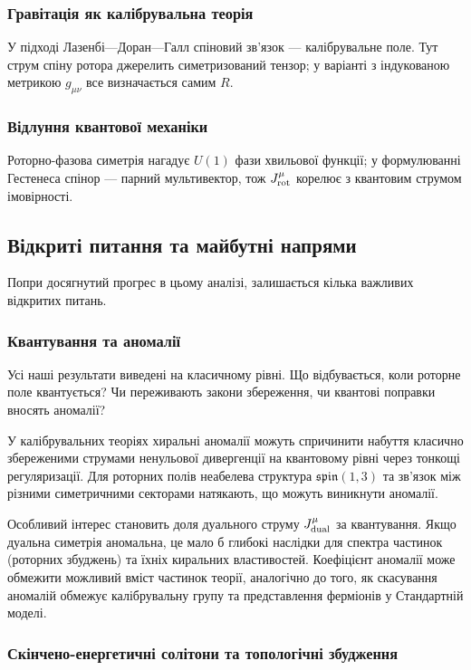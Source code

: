 \documentclass[11pt,a4paper]{article}
\numberwithin{equation}{section}
\theoremstyle{plain}
\theoremstyle{definition}
\theoremstyle{remark}
\begin{document}
\subsubsection{Гравітація як калібрувальна теорія}

У підході Лазенбі—Доран—Галл спіновий зв’язок — калібрувальне поле. Тут струм спіну ротора джерелить симетризований тензор; у варіанті з індукованою метрикою $g_{\mu\nu}$ все визначається самим $R$.

\subsubsection{Відлуння квантової механіки}

Роторно-фазова симетрія нагадує $U(1)$ фази хвильової функції; у формулюванні Гестенеса спінор — парний мультивектор, тож $J^\mu_{\rm rot}$ корелює з квантовим струмом імовірності.

\subsection{Відкриті питання та майбутні напрями}

Попри досягнутий прогрес в цьому аналізі, залишається кілька важливих відкритих питань.

\subsubsection{Квантування та аномалії}

Усі наші результати виведені на класичному рівні. Що відбувається, коли роторне поле квантується? Чи переживають закони збереження, чи квантові поправки вносять аномалії?

У калібрувальних теоріях хиральні аномалії можуть спричинити набуття класично збереженими струмами ненульової дивергенції на квантовому рівні через тонкощі регуляризації. Для роторних полів неабелева структура $\mathfrak{spin}(1,3)$ та зв'язок між різними симетричними секторами натякають, що можуть виникнути аномалії.

Особливий інтерес становить доля дуального струму $J^\mu_{\rm dual}$ за квантування. Якщо дуальна симетрія аномальна, це мало б глибокі наслідки для спектра частинок (роторних збуджень) та їхніх киральних властивостей. Коефіцієнт аномалії може обмежити можливий вміст частинок теорії, аналогічно до того, як скасування аномалій обмежує калібрувальну групу та представлення ферміонів у Стандартній моделі.

\subsubsection{Скінчено-енергетичні солітони та топологічні збудження}
\end{document}
